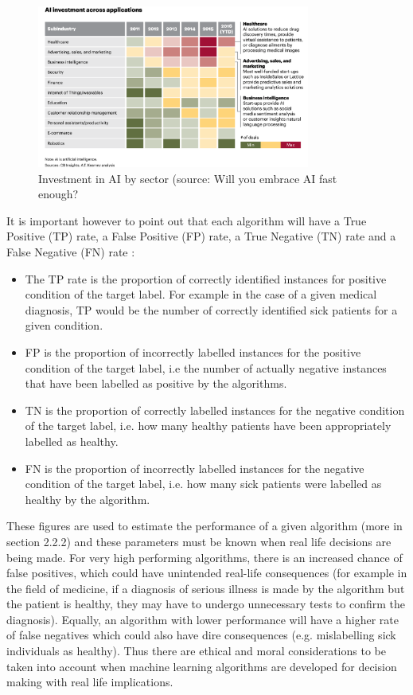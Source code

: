 \begin{figure}[H]
\centering
\includegraphics[width=0.8\textwidth]{ThesisTemplate/usingLatex/images/fig2_2.png}
\caption{Investment in AI by sector (source: Will you embrace AI fast enough? \citep{Evans:sHGdqFvY}}
\label{fig:investement}
\end{figure}

It is important however to point out that each algorithm will have a True Positive (TP) rate, a False Positive (FP) rate, a True Negative (TN) rate and a False Negative (FN) rate \citep{Ting:2016ue}:
\begin{itemize}
    \item The TP rate is the proportion of correctly identified instances for positive condition of the target label. For example in the case of a given medical diagnosis, TP would be the number of correctly identified sick patients for a given condition.
    \item  FP is the proportion of incorrectly labelled instances for the positive condition of the target label, i.e the number of actually negative instances that have been labelled as positive by the algorithms. 
    \item TN is the proportion of correctly labelled instances for the negative condition of the target label, i.e. how many healthy patients have been appropriately labelled as healthy.
    \item FN is the proportion of incorrectly labelled instances for the negative condition of the target label, i.e. how many sick patients were labelled as healthy by the algorithm.
\end{itemize}

These figures are used to estimate the performance of a given algorithm (more in section 2.2.2) and these parameters must be known when real life decisions are being made. \newline For very high performing algorithms, there is an increased chance of false positives, which could have unintended real-life consequences (for example in the field of medicine, if a diagnosis of serious illness is made by the algorithm but the patient is healthy, they may have to undergo unnecessary tests to confirm the diagnosis). \newline 
Equally, an algorithm with lower performance will have a higher rate of false negatives which could also have dire consequences (e.g. mislabelling sick individuals as healthy). Thus there are ethical and moral considerations to be taken into account when machine learning algorithms are developed for decision making with real life implications.\newline 

